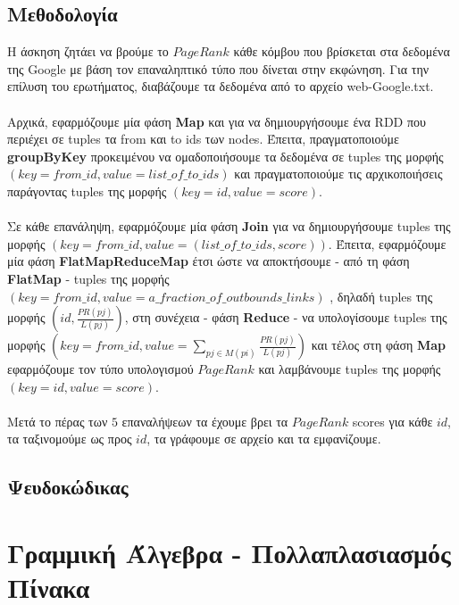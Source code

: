 \documentclass{ntua}
\begin{document}
\subsection{Μεθοδολογία}
H άσκηση ζητάει να βρούμε το $PageRank$ κάθε κόμβου που βρίσκεται στα δεδομένα της Google με βάση τον επαναληπτικό τύπο που δίνεται στην εκφώνηση. Για την επίλυση του ερωτήματος, διαβάζουμε τα δεδομένα από το αρχείο web-Google.txt.\\ \\
Αρχικά, εφαρμόζουμε μία φάση \textbf{Map} και για να δημιουργήσουμε ένα RDD που περιέχει σε tuples τα from και to ids των nodes. Έπειτα, πραγματοποιούμε \textbf{groupByKey} προκειμένου να ομαδοποιήσουμε τα δεδομένα σε tuples της μορφής $( key = from\_id, value = list\_of\_to\_ids)$ και πραγματοποιούμε τις αρχικοποιήσεις παράγοντας tuples της μορφής $( key = id, value = score)$.\\ \\
Σε κάθε επανάληψη, εφαρμόζουμε μία φάση \textbf{Join} για να δημιουργήσουμε tuples της μορφής $( key = from\_id, value = (list\_of\_to\_ids,score))$. Έπειτα, εφαρμόζουμε μία φάση \textbf{FlatMapReduceMap} έτσι ώστε να αποκτήσουμε - από τη φάση \textbf{FlatMap} - tuples της μορφής $( key = from\_id, value = a\_fraction\_of\_outbounds\_links)$ , δηλαδή tuples της μορφής $(id, \frac{PR(pj)}{L(pj)})$, στη συνέχεια - φάση \textbf{Reduce} - να υπολογίσουμε tuples της μορφής $( key = from\_id, value =\sum_{pj\in{M(pi)}}^{} \frac{PR(pj)}{L(pj)}) $ και τέλος στη φάση \textbf{Map} εφαρμόζουμε τον τύπο υπολογισμού $PageRank$ και λαμβάνουμε tuples της μορφής $( key = id, value = score)$.\\ \\
Μετά το πέρας των $5$ επαναλήψεων τα έχουμε βρει τα $PageRank$ scores για κάθε $id$, τα ταξινομούμε ως προς $id$, τα γράφουμε σε αρχείο και τα εμφανίζουμε.  
\subsection{Ψευδοκώδικας}

\newpage

\section{Γραμμική Άλγεβρα - Πολλαπλασιασμός Πίνακα}
\end{document}
